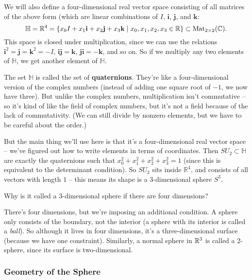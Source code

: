 We will also define a four-dimensional real vector space consisting of all matrices of the above form (which are linear combinations of $I$, $\mathbf{i}$, $\mathbf{j}$, and $\mathbf{k}$:
\[\mathbb{H} = \mathbb R^4 = \{x_0 I + x_1 \mathbf{i} +x_2 \mathbf{j} + x_3 \mathbf{k} \mid x_0, x_1, x_2, x_3 \in \mathbb R\} \subset \operatorname{Mat}_{2\times 2} (\mathbb C).\] 
This space is closed under multiplication, since we can use the relations $\mathbf{i}^2 = \mathbf{j} = \mathbf{k}^2 = -I$, $\mathbf{i} \mathbf{j} = \mathbf{k}$, $\mathbf{j} \mathbf{i} = - \mathbf{k}$, and so on. So if we multiply any two elements of $\mathbb{H}$, we get another element of $\mathbb{H}$. 

The set $\mathbb{H}$ is called the set of \textbf{quaternions}. They're like a four-dimensional version of the complex numbers (instead of adding one square root of $-1$, we now have three). But unlike the complex numbers, multiplication isn't commutative -- so it's kind of like the field of complex numbers, but it's not a field because of the lack of commutativity. (We can still divide by nonzero elements, but we have to be careful about the order.)

But the main thing we'll use here is that it's a four-dimensional real vector space -- we've figured out how to write elements in terms of coordinates. Then $SU_2 \subset \mathbb{H}$ are exactly the quaternions such that $x_0^2 + x_1^2 + x_2^2 + x_3^2 = 1$ (since this is equivalent to the determinant condition). So $SU_2$ sits inside $\mathbb{R}^4$, and consists of all vectors with length $1$ -- this means its shape is a $3$-dimensional sphere $S^3$. 

\begin{question}
    Why is it called a 3-dimensional sphere if there are four dimensions?
\end{question}

\begin{ans}
    There's four dimensions, but we're imposing an additional condition. A sphere only consists of the boundary, not the interior (a sphere with its interior is called a \emph{ball}). So although it lives in four dimensions, it's a three-dimensional surface (because we have one constraint). Similarly, a normal sphere in $\mathbb R^3$ is called a $2$-sphere, since its surface is two-dimensional. 
\end{ans}

\subsubsection{Geometry of the Sphere}

